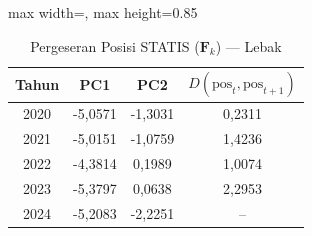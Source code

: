\begin{table}[H]
\centering
\caption{Pergeseran Posisi STATIS ($\mathbf{F}_k$) --- Lebak} \label{tab:app1jarak_statis_skor_lebak}
\begin{adjustbox}{max width=\textwidth, max height=0.85\textheight}
\begin{tabular}{|c|c|c|c|}
\hline
\textbf{Tahun} & \textbf{PC1} & \textbf{PC2} & \textbf{$D(\text{pos}_t, \text{pos}_{t+1})$} \\
\hline
2020 & -5,0571 & -1,3031 & 0,2311 \\
2021 & -5,0151 & -1,0759 & 1,4236 \\
2022 & -4,3814 & 0,1989 & 1,0074 \\
2023 & -5,3797 & 0,0638 & 2,2953 \\
2024 & -5,2083 & -2,2251 & -- \\
\hline
\end{tabular}
\end{adjustbox}
\end{table}
